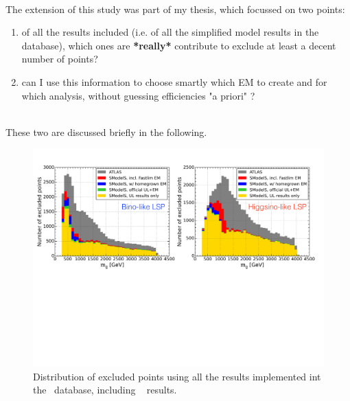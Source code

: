 \documentclass[a4paper,11pt]{article}
\begin{document}
\\

The extension of this study was part of my thesis, which focussed on two points:
\begin{enumerate}
\item of all the results included (i.e. of all the simplified model results in the database), which ones are \textbf{*really*} contribute to exclude at least a decent number of points? \ 
\item can I use this information to choose smartly which EM to create and for which analysis, without guessing efficiencies "a priori" ?
\end{enumerate}
\\

These two are discussed briefly in the following.

\begin{figure}[!]
	\begin{center}
		\includegraphics[width=1\textwidth]{Fig/SMO_Paper/Histo_paper.pdf}
	\end{center}
	\caption{Distribution of excluded points using all the results implemented int the \SMO~database, including \fastlim~ results. }
	\label{smo_paper_histo}
\end{figure}
\end{document}
